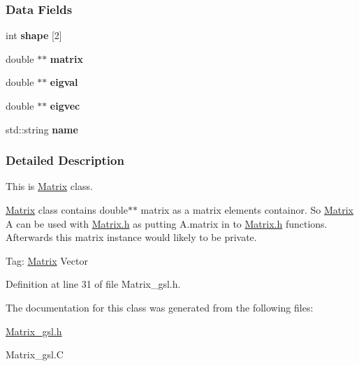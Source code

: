 \subsubsection*{Data Fields}
\begin{DoxyCompactItemize}
\item 
\mbox{\label{classMatrix_a39466a5c9a5f18d84d02f9fb7d060561}} 
int {\bfseries shape} \mbox{[}2\mbox{]}
\item 
\mbox{\label{classMatrix_a4b26a049df7108da3a46d4457afc3735}} 
double $\ast$$\ast$ {\bfseries matrix}
\item 
\mbox{\label{classMatrix_adb7fc5a84b4aa01e1417646cfc048fa8}} 
double $\ast$$\ast$ {\bfseries eigval}
\item 
\mbox{\label{classMatrix_ad12a5a14ff1acaf9862701b6f174fefb}} 
double $\ast$$\ast$ {\bfseries eigvec}
\item 
\mbox{\label{classMatrix_ab15f3c0e2ef820cc3aa6d58475b15443}} 
std\+::string {\bfseries name}
\end{DoxyCompactItemize}


\subsubsection{Detailed Description}
This is \hyperlink{classMatrix}{Matrix} class. 

\hyperlink{classMatrix}{Matrix} class contains double$\ast$$\ast$ matrix as a matrix elements containor. So \hyperlink{classMatrix}{Matrix} A can be used with \hyperlink{Matrix_8h}{Matrix.\+h} as putting A.\+matrix in to \hyperlink{Matrix_8h}{Matrix.\+h} functions. Afterwards this matrix instance would likely to be private.

Tag\+: \hyperlink{classMatrix}{Matrix} Vector 

Definition at line 31 of file Matrix\+\_\+gsl.\+h.



The documentation for this class was generated from the following files\+:\begin{DoxyCompactItemize}
\item 
\hyperlink{Matrix__gsl_8h}{Matrix\+\_\+gsl.\+h}\item 
Matrix\+\_\+gsl.\+C\end{DoxyCompactItemize}
